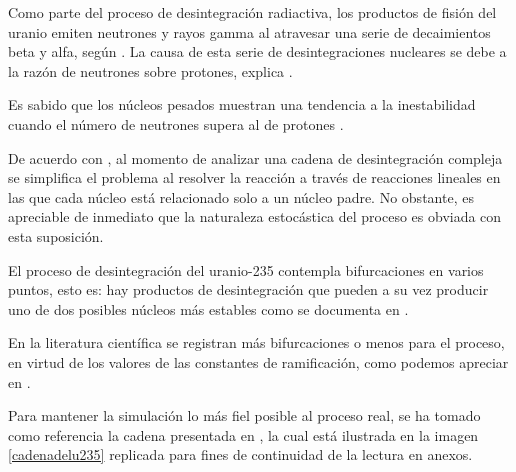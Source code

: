 Como parte del proceso de desintegración radiactiva, los productos de fisión del uranio emiten neutrones y rayos gamma al atravesar una serie de decaimientos beta y alfa, según \cite{Guo.2016}. La causa de esta serie de desintegraciones nucleares se debe a la razón de neutrones sobre protones, explica \cite{Guo.2016}. 

Es sabido que los núcleos pesados muestran una tendencia a la inestabilidad cuando el número de neutrones supera al de protones \cite{Podgorsak.2016, Krane.1987}.  

De acuerdo con \cite{Guo.2016}, al momento de analizar una cadena de desintegración compleja se simplifica el problema al resolver la reacción a través de reacciones lineales en las que cada núcleo está relacionado solo a un núcleo padre. No obstante, es apreciable de inmediato que la naturaleza estocástica del proceso es obviada con esta suposición.

El proceso de desintegración del uranio-235 contempla bifurcaciones en varios puntos, esto es: hay productos de desintegración que pueden a su vez producir uno de dos posibles núcleos más estables como se documenta en \cite{HUBENER2003211, International_Atomic_Energy_Agency2013-bq}. 

En la literatura científica se registran más bifurcaciones o menos para el proceso, en virtud de los valores de las constantes de ramificación, como podemos apreciar en \cite{HUBENER2003211,International_Atomic_Energy_Agency2013-bq,Pratiwi.2021,Loch.2013}. 

Para mantener la simulación lo más fiel posible al proceso real, se ha tomado como referencia la cadena presentada en \cite{HUBENER2003211}, la cual está ilustrada en la imagen \ref{cadenadelu235} replicada para fines de continuidad de la lectura en anexos.


